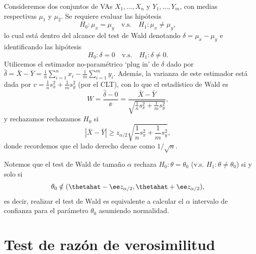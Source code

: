 \begin{example}
 Consideremos dos conjuntos de VAs $X_1,\ldots,X_n$ y $Y_1,\ldots,Y_m$, con medias respectivas $\mu_1$ y $\mu_2$. Se requiere evaluar las hipótesis
 	\begin{equation}
		H_0:\mu_x =\mu_y \quad \text{v.s.}\quad H_1:\mu_x \neq \mu_y,
	\end{equation}
	lo cual está dentro del alcance del test de Wald denotando $\delta = \mu_x - \mu_y$ e identificando las hipótesis
	 	\begin{equation}
		H_0:\delta =0 \quad \text{v.s.}\quad H_1:\delta \neq 0.
	\end{equation}
Utilicemos el estimador no-paramétrico `plug in' de $\delta$ dado por  $\hat{\delta} = \bar{X}-\bar{Y} = \frac{1}{n}\sum_{i=1}^n x_i - \frac{1}{m}\sum_{i=1}^m y_i$. Además, la varianza de este estimador está dada por $v = \frac{1}{n}s_x^2 + \frac{1}{m}s_y^2$ (por el CLT), con lo que el  estadístico de Wald es
\begin{equation}
	W = \frac{\hat{\delta}-0}{\ee} = \frac{\bar{X}-\bar{Y}}{\sqrt{\frac{1}{n}s_x^2 + \frac{1}{m}s_y^2}},
\end{equation}
y rechazamos rechazamos $H_0$ si
\begin{equation}
	|\bar{X}-\bar{Y}| \geq z_{\alpha/2} \sqrt{\frac{1}{n}s_x^2 + \frac{1}{m}s_y^2},
\end{equation}
donde recordemos que el lado derecho decae como $1/\sqrt{n}$.
\end{example}

\begin{remark}
Notemos que el test de Wald de tamaño $\alpha$ rechaza $H_0:\theta=\theta_0$ (v.s. $H_1:\theta\neq\theta_0$) si y solo si 
\begin{equation}
	\theta_0 \notin (\thetahat - \ee z_{\alpha/2},\thetahat + \ee z_{\alpha/2}),
\end{equation}
es decir, realizar el test de Wald es equivalente a calcular el $\alpha$ intervalo de confianza para el parámetro $\theta_0$ asumiendo normalidad.
\end{remark}


\section{Test de razón de verosimilitud} 
\label{sub:test_de_RV}

